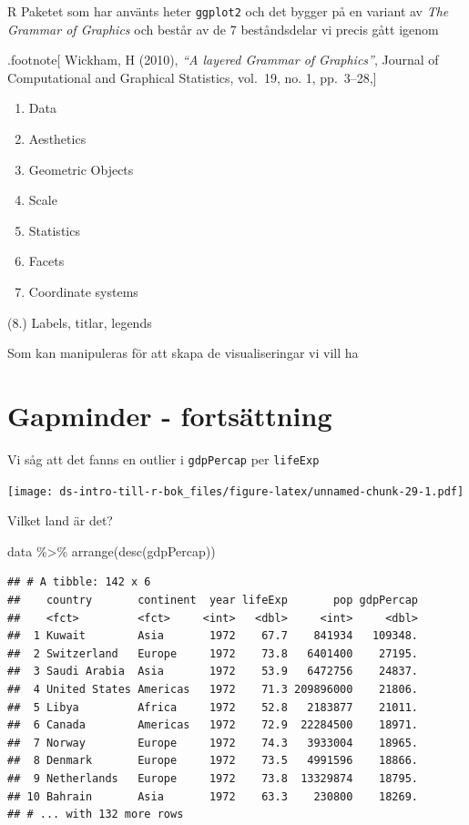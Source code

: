 \documentclass[
]{book}
\newenvironment{Shaded}{\begin{snugshade}}{\end{snugshade}}
\newcommand{\FunctionTok}[1]{\textcolor[rgb]{0.00,0.00,0.00}{#1}}
\newcommand{\NormalTok}[1]{#1}
\newcommand{\SpecialCharTok}[1]{\textcolor[rgb]{0.00,0.00,0.00}{#1}}
\begin{document}
R Paketet som har använts heter \texttt{ggplot2} och det bygger på en variant av \emph{The Grammar of Graphics} och består av de 7 beståndsdelar vi precis gått igenom

.footnote{[}
Wickham, H (2010), \emph{``A layered Grammar of Graphics''}, Journal of Computational and Graphical Statistics, vol.~19, no. 1, pp.~3--28,{]}

\begin{enumerate}
\def\labelenumi{\arabic{enumi}.}
\item
  Data
\item
  Aesthetics
\item
  Geometric Objects
\item
  Scale
\item
  Statistics
\item
  Facets
\item
  Coordinate systems
\end{enumerate}

(8.) Labels, titlar, legends

Som kan manipuleras för att skapa de visualiseringar vi vill ha

\hypertarget{gapminder---fortsuxe4ttning}{%
\section{Gapminder - fortsättning}\label{gapminder---fortsuxe4ttning}}

Vi såg att det fanns en outlier i \texttt{gdpPercap} per \texttt{lifeExp}

\texttt{[image: ds-intro-till-r-bok\_files/figure-latex/unnamed-chunk-29-1.pdf]}

Vilket land är det?

\begin{Shaded}
\begin{Highlighting}[]
\NormalTok{data }\SpecialCharTok{\%\textgreater{}\%} \FunctionTok{arrange}\NormalTok{(}\FunctionTok{desc}\NormalTok{(gdpPercap))}
\end{Highlighting}
\end{Shaded}

\begin{verbatim}
## # A tibble: 142 x 6
##    country       continent  year lifeExp       pop gdpPercap
##    <fct>         <fct>     <int>   <dbl>     <int>     <dbl>
##  1 Kuwait        Asia       1972    67.7    841934   109348.
##  2 Switzerland   Europe     1972    73.8   6401400    27195.
##  3 Saudi Arabia  Asia       1972    53.9   6472756    24837.
##  4 United States Americas   1972    71.3 209896000    21806.
##  5 Libya         Africa     1972    52.8   2183877    21011.
##  6 Canada        Americas   1972    72.9  22284500    18971.
##  7 Norway        Europe     1972    74.3   3933004    18965.
##  8 Denmark       Europe     1972    73.5   4991596    18866.
##  9 Netherlands   Europe     1972    73.8  13329874    18795.
## 10 Bahrain       Asia       1972    63.3    230800    18269.
## # ... with 132 more rows
\end{verbatim}
\end{document}
